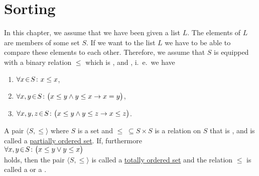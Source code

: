 \chapter{Sorting}
In this chapter, we assume that we have been given a list $L$.  The elements of $L$ are members of
some set $S$.  If we want to  the list $L$ we have to be able to compare these elements
to each other.   Therefore, we assume that $S$ is equipped with a binary relation $\leq$ which is
,  and , i.~e.~we have  
\begin{enumerate}
\item $\forall x \!\in\! S \colon x \leq x$,
\item $\forall x, y \!\in\! S \colon \bigl(x \leq y \wedge y \leq x
  \rightarrow x = y\bigr)$, 
\item $\forall x, y, z \!\in\! S \colon \bigl(x \leq y \wedge y \leq z \rightarrow x \leq z\bigr)$. 
\end{enumerate}
A pair $\langle S, \leq \rangle$ where $S$ is a set and $\leq \;\subseteq S \times S$ is a relation
on $S$ that is ,  and  is called a
\href{http://en.wikipedia.org/wiki/Partially_ordered_set}{partially ordered set}.  
If, furthermore
\\[0.2cm]
\hspace*{1.3cm}
$\forall x, y \!\in\! S \colon\bigl( x \leq y \vee y \leq x\bigr)$
\\[0.2cm]
holds, then the pair $\langle S, \leq \rangle$ is called a 
\href{http://en.wikipedia.org/wiki/Totally_ordered_set}{totally ordered set} and
the relation $\leq$ is called a  or a .

